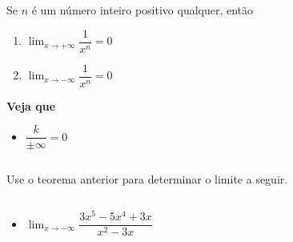 \begin{frame}
  \begin{columns}[onlytextwidth]
    \begin{column}{0.5\textwidth}\vspace*{-0.5cm}
      \begin{theorem}[\phantom{ç}]
        Se $n$ é um número inteiro positivo qualquer, então
        \begin{enumerate}
          \item $\displaystyle\lim_{x\rightarrow +\infty}\dfrac{1}{x^{n}} = 0$
          \item $\displaystyle\lim_{x\rightarrow -\infty}\dfrac{1}{x^{n}} = 0$
        \end{enumerate}
      \end{theorem}
      \begin{highlight}
        \textbf{Veja que}
        \begin{itemize}
          \item $\dfrac{k}{\pm\infty} = 0$
        \end{itemize}
      \end{highlight}
    \end{column}
    \begin{column}{0.5\textwidth}\vspace*{-0.5cm}
      \begin{figure}
      \end{figure}
    \end{column}
  \end{columns}
\end{frame}

\begin{frame}
  \begin{example}
    Use o teorema anterior para determinar o limite a seguir.
  \end{example}
  \begin{columns}[onlytextwidth]
    \begin{column}{0.5\textwidth}
      \begin{itemize}
        \item $\displaystyle\lim_{x\rightarrow -\infty}\dfrac{3x^{5} - 5x^{4} + 3x}{x^{2} - 3x}$
      \end{itemize}
    \end{column}
    \begin{column}{0.5\textwidth}
    \end{column}
  \end{columns}
\end{frame}

